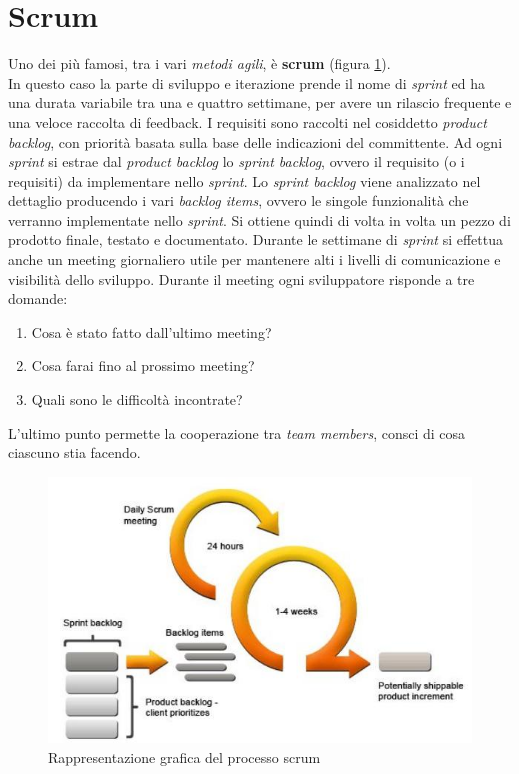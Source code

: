 \documentclass[a4paper,12pt, oneside]{book}
\begin{document}
\section{Scrum}
Uno dei più famosi, tra i vari \textit{metodi agili}, è \textbf{scrum} (figura
\ref{scrum}).\\
In questo caso la parte di sviluppo e iterazione prende il nome di
\textit{sprint} ed ha una durata variabile tra una e quattro settimane, per avere
un rilascio frequente e una veloce raccolta di feedback. I requisiti sono
raccolti nel cosiddetto \textit{product backlog}, con priorità basata sulla base
delle indicazioni del committente. Ad ogni \textit{sprint} si estrae dal
\textit{product backlog} lo \textit{sprint backlog}, ovvero il requisito (o i
requisiti) da implementare nello \textit{sprint}. Lo \textit{sprint backlog}
viene analizzato nel dettaglio producendo i vari \textit{backlog items}, ovvero
le singole funzionalità che verranno implementate nello \textit{sprint}. Si
ottiene quindi di volta in volta un pezzo di prodotto finale, testato e
documentato. Durante le settimane di \textit{sprint} si effettua anche un meeting
giornaliero utile per mantenere alti i livelli di comunicazione e visibilità
dello sviluppo. Durante il meeting ogni sviluppatore risponde a tre domande:
\begin{enumerate}
  \item Cosa è stato fatto dall'ultimo meeting?
  \item Cosa farai fino al prossimo meeting?
  \item Quali sono le difficoltà incontrate?
\end{enumerate}
L'ultimo punto permette la cooperazione tra \textit{team members}, consci di cosa
ciascuno stia facendo.\\
\begin{figure}
  \centering
  \includegraphics[scale = 0.6]{img/scrum.jpg}
  \caption{Rappresentazione grafica del processo scrum}
  \label{scrum}
\end{figure}
\end{document}
